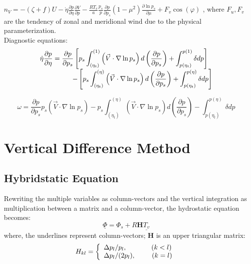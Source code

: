 \documentclass[12pt,a4paper]{book}
\begin{document}
$\displaystyle n_V = -(\zeta + f)U 
- \dot{\eta}\frac{\partial p}{\partial \eta} \frac{\partial V}{\partial p} 
- \frac{RT_v}{a} \frac{p_s}{p} \frac{\partial p}{\partial p_s} (1-\mu^2) \frac{\partial \ln p_s}{\partial \mu} 
+ F_v\cos(\varphi)$
, where $F_u, F_v$ are the tendency of zonal and meridional wind due to the physical parameterization. \\

Diagnostic equations:
	\begin{equation} \label{eq:verticaladv}
	\begin{array}{l}
	\displaystyle 
	\dot{\eta} \frac{\partial p}{\partial \eta} = 
	\frac{\partial p}{\partial p_s} \left[ p_s \int_{(\eta_t)}^{(1)} \left( \vec{V} \cdot \nabla \ln p_s \right) d \left( \frac{\partial p}{\partial p_s} \right)  
	+ \int_{p(\eta_t)}^{p(1)} \delta dp \right] \\
	\displaystyle 
	\hspace{4 pc} - \left[ p_s \int_{(\eta_t)}^{(\eta)} \left( \vec{V} \cdot \nabla \ln p_s \right) d \left( \frac{\partial p}{\partial p_s} \right)  
	+ \int_{p(\eta_t)}^{p(\eta)} \delta dp \right]
	\end{array}
	\end{equation}

	\begin{equation} \label{eq:omega}
	\omega = \frac{\partial p}{\partial p_s} p_s \left( \vec{V} \cdot \nabla \ln p_s \right) 
	- p_s \int_{(\eta_t)}^{(\eta)} \left( \vec{V} \cdot \nabla \ln p_s \right) d \left( \frac{\partial p}{\partial p_s} \right)
	- \int_{p(\eta_t)}^{p(\eta)} \delta dp
	\end{equation}

\section{Vertical Difference Method} \label{2.3verticaldiff}

\subsection{Hybridstatic Equation}	

	Rewriting the multiple variables as column-vectors and the vertical integration as multiplication between a matrix and a column-vector, the hydrostatic equation becomes:
	\begin{equation} \label{eq:gp}
	\underline{\Phi}  =  \Phi_s + R \boldsymbol{H} \underline{T_v} 
	\end{equation}
where, the underlines represent column-vectors; $\boldsymbol{H}$ is an upper triangular matrix:
	\begin{equation} \label{eq:matrixH}
	H_{kl} = \left\lbrace
	\begin{array}{l}
	\Delta p_l / p_l,  \hspace{3 pc} (k<l) \\
	\Delta p_l / (2p_l), \hspace{2 pc} (k=l)
	\end{array} \right.
	\end{equation}
\end{document}
